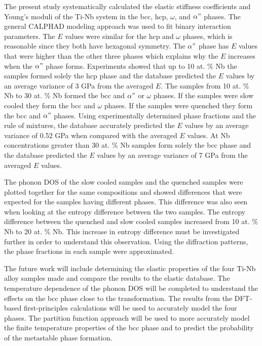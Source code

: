 The present study systematically calculated the elastic stiffness coefficients and Young's moduli of the Ti-Nb system in the bcc, hcp, $\omega$, and $\alpha"$ phases. The general CALPHAD modeling approach was used to fit binary interaction parameters. The $E$ values were similar for the hcp and $\omega$ phases, which is reasonable since they both have hexagonal symmetry. The $\alpha"$ phase has $E$ values that were higher than the other three phases which explains why the $E$ increases when the $\alpha"$ phase forms. Experiments showed that up to 10 at. \% Nb the samples formed solely the hcp phase and the database predicted the $E$ values by an average variance of 3 GPa from the averaged $E$. The samples from 10 at. \% Nb to 30 at. \% Nb formed the bcc and $\alpha"$ or $\omega$ phases. If the samples were slow cooled they form the bcc and $\omega$ phases. If the samples were quenched they form the bcc and $\alpha"$ phases. Using experimentally determined phase fractions and the rule of mixtures, the database accurately predicted the $E$ values by an average variance of 0.52 GPa when compared with the averaged $E$ values. At Nb concentrations greater than 30 at. \% Nb samples form solely the bcc phase and the database predicted the $E$ values by an average variance of 7 GPa from the averaged $E$ values. 

The phonon DOS of the slow cooled samples and the quenched samples were plotted together for the same compositions and showed differences that were expected for the samples having different phases. This difference was also seen when looking at the entropy difference between the two samples. The entropy difference between the quenched and slow cooled samples increased from 10 at. \% Nb to 20 at. \% Nb. This increase in entropy difference must be investigated further in order to understand this observation. Using the diffraction patterns, the phase fractions in each sample were approximated. 

The future work will include determining the elastic properties of the four Ti-Nb alloy samples made and compare the results to the elastic database. The temperature dependence of the phonon DOS will be completed to understand the effects on the bcc phase close to the transformation. The results from the DFT-based first-principles calculations will be used to accurately model the four phases. The partition function approach will be used to more accurately model the finite temperature properties of the bcc phase and to predict the probability of the metastable phase formation.

